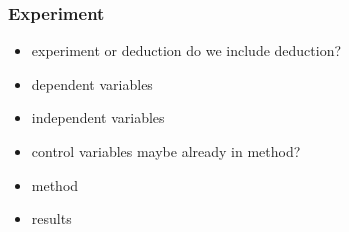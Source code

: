 \subsubsection{Experiment}

\begin{itemize}
	\item experiment or deduction {\color{red} do we include deduction?}
	\item dependent variables
	\item independent variables
	\item control variables {\color{red} maybe already in method?}
	\item method
	\item results
\end{itemize}